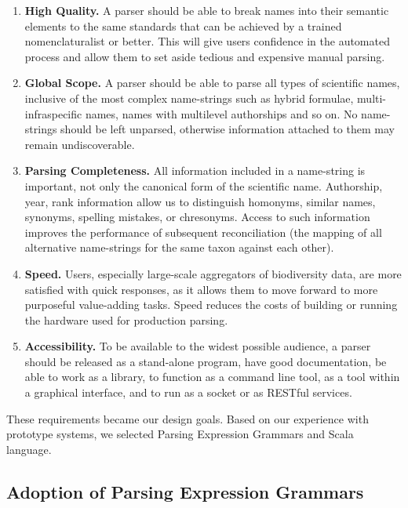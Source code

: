 \documentclass{bmcart}
\begin{document}
\begin{enumerate}

  \item \textbf{High Quality.} A parser should be able to break names into their semantic elements to the same standards that can be achieved by a trained nomenclaturalist or better. This will give users confidence in the automated process and allow them to set aside tedious and expensive manual parsing.

  \item \textbf{Global Scope.} A parser should be able to parse all types of scientific names, inclusive of the most complex name-strings such as hybrid formulae, multi-infraspecific names, names with multilevel authorships and so on. No name-strings should be left unparsed, otherwise information attached to them may remain undiscoverable.

  \item \textbf{Parsing Completeness.} All information included in a name-string is important, not only the canonical form of the scientific name. Authorship, year, rank information allow us to distinguish homonyms, similar names, synonyms, spelling mistakes, or chresonyms. Access to such information improves the performance of subsequent reconciliation (the mapping of all alternative name-strings for the same taxon against each other).

  \item \textbf{Speed.} Users, especially large-scale aggregators of biodiversity data, are more satisfied with quick responses, as it allows them to move forward to more purposeful value-adding tasks. Speed reduces the costs of building or running the hardware used for production parsing.

  \item \textbf{Accessibility.} To be available to the widest possible audience, a parser should be released as a stand-alone program, have good documentation, be able to work as a library, to function as a command line tool, as a tool within a graphical interface, and to run as a socket or as RESTful services.

\end{enumerate}

These requirements became our design goals. Based on our experience with prototype systems, we selected Parsing Expression Grammars and Scala language.

\subsection*{Adoption of Parsing Expression Grammars}
\end{document}
